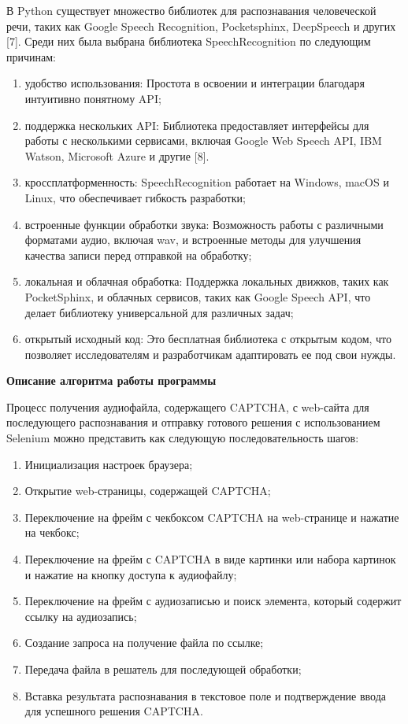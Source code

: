 В Python существует множество библиотек для распознавания человеческой речи, 
таких как Google Speech Recognition, Pocketsphinx, DeepSpeech и других [7]. 
Среди них была выбрана библиотека SpeechRecognition по следующим причинам:

\begin{enumerate}
    \item удобство использования: Простота в освоении и интеграции благодаря 
    интуитивно понятному API;
    \item поддержка нескольких API: Библиотека предоставляет интерфейсы для 
    работы с несколькими сервисами, включая Google Web Speech API, IBM Watson, 
    Microsoft Azure и другие [8].
    \item кроссплатформенность: SpeechRecognition работает на Windows, macOS и 
    Linux, что обеспечивает гибкость разработки;
    \item встроенные функции обработки звука: Возможность работы с различными 
    форматами аудио, включая wav, и встроенные методы для улучшения качества 
    записи перед отправкой на обработку;
    \item локальная и облачная обработка: Поддержка локальных движков, таких как 
    PocketSphinx, и облачных сервисов, таких как Google Speech API, что делает 
    библиотеку универсальной для различных задач;
    \item открытый исходный код: Это бесплатная библиотека с открытым кодом, что 
    позволяет исследователям и разработчикам адаптировать ее под свои нужды.
\end{enumerate}

\textbf{Описание алгоритма работы программы}

Процесс получения аудиофайла, содержащего CAPTCHA, с web-сайта для последующего 
распознавания и отправку готового решения с использованием Selenium можно 
представить как следующую последовательность шагов:

\begin{enumerate}
    \item Инициализация настроек браузера;
    \item Открытие web-страницы, содержащей CAPTCHA;
    \item Переключение на фрейм с чекбоксом CAPTCHA на web-странице и нажатие на 
    чекбокс;
    \item Переключение на фрейм с CAPTCHA в виде картинки или набора картинок и 
    нажатие на кнопку доступа к аудиофайлу;
    \item Переключение на фрейм с аудиозаписью и поиск элемента, который содержит 
    ссылку на аудиозапись;
    \item Создание запроса на получение файла по ссылке;
    \item Передача файла в решатель для последующей обработки;
    \item Вставка результата распознавания в текстовое поле и подтверждение ввода 
    для успешного решения CAPTCHA.
\end{enumerate}

